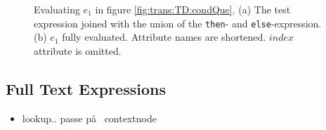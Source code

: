 \begin{myExample}
\begin{figure}[h]
\qquad
{}
\caption[Evaluating $e_1$ in figure \ref{fig:trans:TD:condQue}.]{Evaluating $e_1$ in figure
\ref{fig:trans:TD:condQue}. (a) The test expression joined with the union of the \texttt{then}- and
\texttt{else}-expression. (b) $e_1$ fully evaluated. Attribute names are shortened. $index$ attribute is omitted.
\label{fig:trans:TD:condRes} }
\end{figure}

\end{myExample}



\subsection{Full Text Expressions}
\label{sect:trans:TD:fulltext}
\begin{itemize}
  \item lookup.. passe p\aa~ contextnode
\end{itemize}
